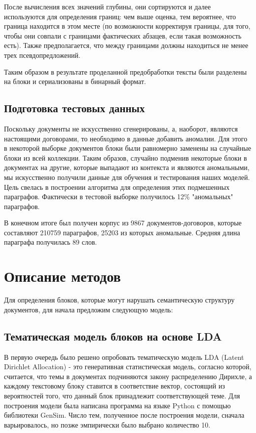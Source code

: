 \documentclass[12pt]{article}
\begin{document}
\begin{enumerate}
{		После вычисления всех значений глубины, они сортируются и далее используются для определения границ: чем выше оценка, тем вероятнее, что граница находится в этом месте (по возможности корректируя границы, для того, чтобы они совпали с границами фактических абзацев, если такая возможность есть). Также предполагается, что между границами должны находиться не менее трех псевдопредложений.
}\end{enumerate}


Таким образом в результате проделанной предобработки тексты были разделены на блоки и сериализованы в бинарный формат.

\subsection{Подготовка тестовых данных}
Поскольку документы не искусственно сгенерированы, а, наоборот, являются настоящими договорами, то необходимо в данные добавить аномалии. Для этого в некоторой выборке документов блоки были равномерно заменены на случайные блоки из всей коллекции. Таким образов, случайно подменив некоторые блоки в документах на другие, которые выпадают из контекста и являются аномальными, мы искусственно получили данные для обучения и тестирования наших моделей. Цель свелась в построении алгоритма для определения этих подмешенных параграфов. Фактически в тестовой выборке получилось  12\% "аномальных" параграфов.

В конечном итоге был получен корпус из 9867 документов-договоров, которые составляют 210759 параграфов, 25203 из которых аномальные. Средняя длина параграфа получилась 89 слов.

\newpage
\section{Описание методов}
Для определения блоков, которые могут нарушать семантическую структуру документов, для начала предложим следующую модель:

\subsection{Тематическая модель блоков на основе LDA}
В первую очередь было решено опробовать тематическую модель LDA (Latent Dirichlet Allocation) - это генеративная статистическая модель, согласно которой, считается, что темы в документах подчиняются закону распределению Дирихле, а каждому текстовому блоку ставится в соответствие вектор, состоящий из вероятностей того, что данный блок принадлежит соответствующей теме. Для построения модели была написана программа на языке Python с помощью библиотеки GenSim. Число тем, полученное после построения модели, сначала варьировалось, но позже эмпирически было выбрано количество 10. 
\end{document}
